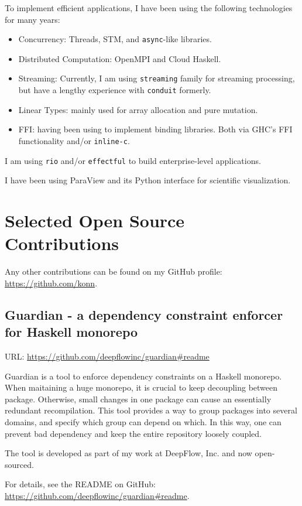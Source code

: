 \documentclass{moderncv}
\begin{document}
To implement efficient applications, I have been using the following technologies for many years:

\begin{itemize}
  \item Concurrency: Threads, STM, and \texttt{async}-like libraries.
  \item Distributed Computation: OpenMPI and Cloud Haskell.
  \item Streaming: Currently, I am using \texttt{streaming} family for streaming processing, but have a lengthy experience with \texttt{conduit} formerly.
  \item Linear Types: mainly used for array allocation and pure mutation.
  \item FFI: having been using to implement binding libraries. Both via GHC's FFI functionality and/or \texttt{inline-c}.
\end{itemize}

I am using \texttt{rio} and/or \texttt{effectful} to build enterprise-level applications.

I have been using ParaView and its Python interface for scientific visualization.

\section{Selected Open Source Contributions}

Any other contributions can be found on my GitHub profile: \url{https://github.com/konn}.

\subsection{Guardian - a dependency constraint enforcer for Haskell monorepo}

URL: \url{https://github.com/deepflowinc/guardian#readme}

Guardian is a tool to enforce dependency constraints on a Haskell monorepo.
When maitaining a huge monorepo, it is crucial to keep decoupling between package. Otherwise, small changes in one package can cause an essentially redundant recompilation.
This tool provides a way to group packages into several domains, and specify which group can depend on which. In this way, one can prevent bad dependency and keep the entire repository loosely coupled.

The tool is developed as part of my work at DeepFlow, Inc. and now open-sourced.

For details, see the README on GitHub: \url{https://github.com/deepflowinc/guardian#readme}.
\end{document}
